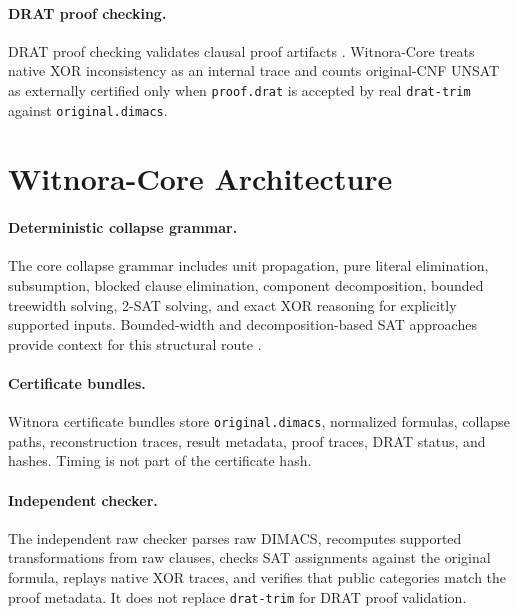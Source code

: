 \documentclass[10pt]{article}
\begin{document}
\paragraph{DRAT proof checking.}
DRAT proof checking validates clausal proof artifacts
\cite{wetzler2014drattrim,heule2016drat}. Witnora-Core treats native XOR
inconsistency as an internal trace and counts original-CNF UNSAT as externally
certified only when \texttt{proof.drat} is accepted by real \texttt{drat-trim}
against \texttt{original.dimacs}.

\section{Witnora-Core Architecture}

\paragraph{Deterministic collapse grammar.}
The core collapse grammar includes unit propagation, pure literal elimination,
subsumption, blocked clause elimination, component decomposition, bounded
treewidth solving, 2-SAT solving, and exact XOR reasoning for explicitly
supported inputs. Bounded-width and decomposition-based SAT approaches provide
context for this structural route \cite{gottlob2002hypertree,samer2010boundedtreewidth}.

\paragraph{Certificate bundles.}
Witnora certificate bundles store \texttt{original.dimacs}, normalized
formulas, collapse paths, reconstruction traces, result metadata, proof traces,
DRAT status, and hashes. Timing is not part of the certificate hash.

\paragraph{Independent checker.}
The independent raw checker parses raw DIMACS, recomputes supported
transformations from raw clauses, checks SAT assignments against the original
formula, replays native XOR traces, and verifies that public categories match
the proof metadata. It does not replace \texttt{drat-trim} for DRAT proof
validation.
\end{document}
